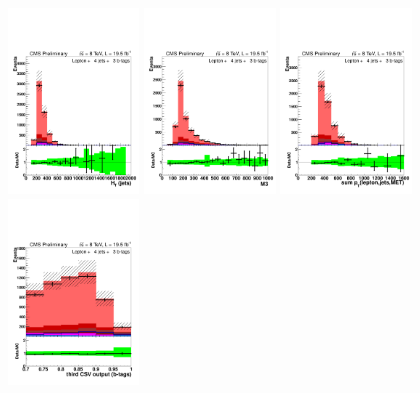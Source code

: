 \begin{figure}[hbtp]
 \begin{center}
   \includegraphics[width=0.31\textwidth]{Figures/Analysis_2_Diagrams/LJ_plots_lep/4j3t/lep_HT_4j3t_cumulative_wRatio_noLegend_lin.pdf}
   \includegraphics[width=0.31\textwidth]{Figures/Analysis_2_Diagrams/LJ_plots_lep/4j3t/lep_M3_4j3t_cumulative_wRatio_noLegend_lin.pdf}
   \includegraphics[width=0.31\textwidth]{Figures/Analysis_2_Diagrams/LJ_plots_lep/4j3t/lep_all_sum_pt_with_met_4j3t_cumulative_wRatio_noLegend_lin.pdf}
   \includegraphics[width=0.31\textwidth]{Figures/Analysis_2_Diagrams/LJ_plots_lep/4j3t/lep_jet_csv_3_4j3t_cumulative_wRatio_noLegend_lin.pdf}

\end{center}
\end{figure}
